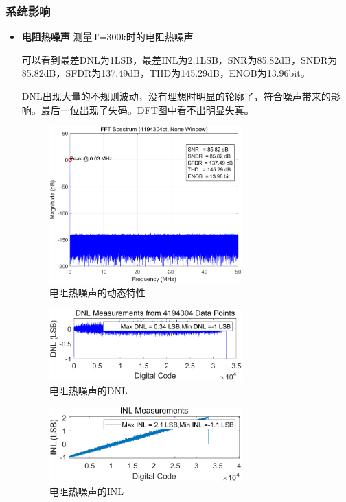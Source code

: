 \documentclass[cs4size,a4paper]{ctexart}
\numberwithin{equation}{section}
\numberwithin{table}{section}
\numberwithin{figure}{section}
\begin{document}
\subsubsection{系统影响}

	\begin{itemize}

	\item \textbf{电阻热噪声} 测量T=300k时的电阻热噪声
		
		可以看到最差DNL为1LSB，最差INL为2.1LSB，SNR为85.82dB，SNDR为85.82dB，SFDR为137.49dB，THD为145.29dB，ENOB为13.96bit。

		DNL出现大量的不规则波动，没有理想时明显的轮廓了，符合噪声带来的影响。最后一位出现了失码。DFT图中看不出明显失真。
		\begin{figure}[H]
			\centering
			\includegraphics[width=0.7\textwidth]{pic/KT/DFT.png}
			\caption{电阻热噪声的动态特性} 
		\end{figure}

		\begin{figure}[H]
			\centering
			\includegraphics[width=0.7\textwidth]{pic/KT/DNL.png}
			\caption{电阻热噪声的DNL} 
		\end{figure}

		\begin{figure}[H]
			\centering
			\includegraphics[width=0.7\textwidth]{pic/KT/INL.png}
			\caption{电阻热噪声的INL} 
		\end{figure}


\end{itemize}
\end{document}
